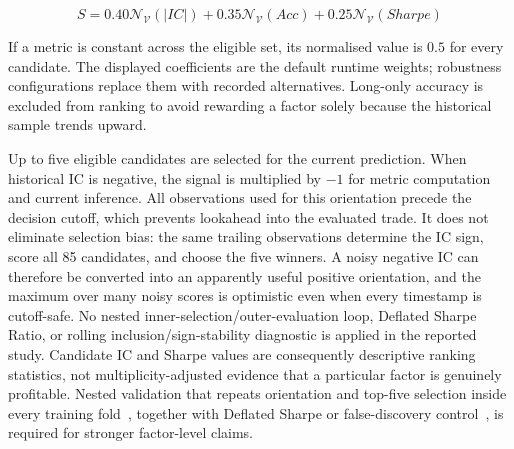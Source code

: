 \begin{equation}
S = 0.40\mathcal{N}_{\mathcal{V}}(|IC|)
  + 0.35\mathcal{N}_{\mathcal{V}}(Acc)
  + 0.25\mathcal{N}_{\mathcal{V}}(Sharpe)
\label{eq:composite_score}
\end{equation}

If a metric is constant across the eligible set, its normalised value is $0.5$ for every candidate. The displayed coefficients are the default runtime weights; robustness configurations replace them with recorded alternatives. Long-only accuracy is excluded from ranking to avoid rewarding a factor solely because the historical sample trends upward.

Up to five eligible candidates are selected for the current prediction. When historical IC is negative, the signal is multiplied by $-1$ for metric computation and current inference. All observations used for this orientation precede the decision cutoff, which prevents lookahead into the evaluated trade. It does not eliminate selection bias: the same trailing observations determine the IC sign, score all 85 candidates, and choose the five winners. A noisy negative IC can therefore be converted into an apparently useful positive orientation, and the maximum over many noisy scores is optimistic even when every timestamp is cutoff-safe. No nested inner-selection/outer-evaluation loop, Deflated Sharpe Ratio, or rolling inclusion/sign-stability diagnostic is applied in the reported study. Candidate IC and Sharpe values are consequently descriptive ranking statistics, not multiplicity-adjusted evidence that a particular factor is genuinely profitable. Nested validation that repeats orientation and top-five selection inside every training fold~\cite{varma2006bias}, together with Deflated Sharpe or false-discovery control~\cite{bailey2014deflated,harvey2016}, is required for stronger factor-level claims.


